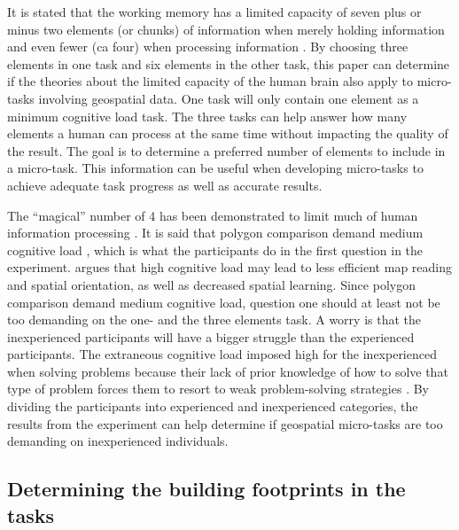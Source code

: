 It is stated that the working memory has a limited capacity of seven plus or minus two elements (or chunks) of information when merely holding information and even fewer (ca four) when processing information \citep{Leppink2014a}. By choosing three elements in one task and six elements in the other task, this paper can determine if the theories about the limited capacity of the human brain also apply to micro-tasks involving geospatial data. One task will only contain one element as a minimum cognitive load task. The three tasks can help answer how many elements a human can process at the same time without impacting the quality of the result. The goal is to determine a preferred number of elements to include in a micro-task. This information can be useful when developing micro-tasks to achieve adequate task progress as well as accurate results.

The “magical” number of 4 has been demonstrated to limit much of human information processing \citep{Mandler2013}. It is said that polygon comparison demand medium cognitive load \citep{Kiefer2016}, which is what the participants do in the first question in the experiment. \cite{Kiefer2016} argues that high cognitive load may lead to less efficient map reading and spatial orientation, as well as decreased spatial learning. Since polygon comparison demand medium cognitive load, question one should at least not be too demanding on the one- and the three elements task. A worry is that the inexperienced participants will have a bigger struggle than the experienced participants. The extraneous cognitive load imposed high for the inexperienced when solving problems because their lack of prior knowledge of how to solve that type of problem forces them to resort to weak problem-solving strategies \citep{Leppink2014a}. By dividing the participants into experienced and inexperienced categories, the results from the experiment can help determine if geospatial micro-tasks are too demanding on inexperienced individuals. 

\subsection[Building shapes]{Determining the building footprints in the tasks}


